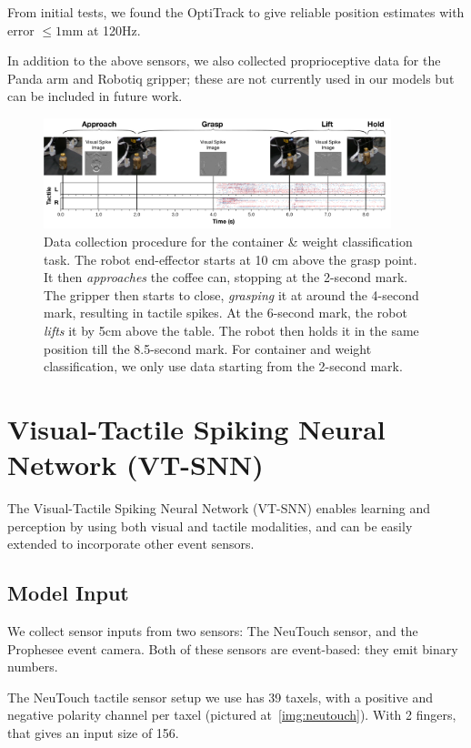 \documentclass[fyp]{socreport}
\begin{document}
From initial tests, we found the OptiTrack to give reliable position estimates
with error $\leq 1$mm at 120Hz.

In addition to the above sensors, we also collected proprioceptive data for the
Panda arm and Robotiq gripper; these are not currently used in our models but
can be included in future work.

\begin{figure}
\centering
\includegraphics[width=0.90\textwidth]{images/robotsetup/RobotMotion_Exp1.pdf}
\caption{Data collection procedure for the container \& weight classification
  task. The robot end-effector starts at 10 cm above the grasp point. It then
  \emph{approaches} the coffee can, stopping at the 2-second mark. The gripper
  then starts to close, \emph{grasping} it at around the 4-second mark,
  resulting in tactile spikes. At the 6-second mark, the robot \emph{lifts} it
  by 5cm above the table. The robot then holds it in the same position till the
  8.5-second mark. For container and weight classification, we only use data
  starting from the 2-second mark.}
\label{fig:robot_motion}
\end{figure}

\chapter{Visual-Tactile Spiking Neural Network (VT-SNN)\label{cha:vtsnn}}

The Visual-Tactile Spiking Neural Network (VT-SNN) enables learning and
perception by using both visual and tactile modalities, and can be easily
extended to incorporate other event sensors.

\section{Model Input}

We collect sensor inputs from two sensors: The NeuTouch sensor, and the
Prophesee event camera. Both of these sensors are event-based: they emit binary
numbers.

The NeuTouch tactile sensor setup we use has 39 taxels, with a positive and
negative polarity channel per taxel (pictured at~\autoref{img:neutouch}).
With 2 fingers, that gives an input size of 156.
\end{document}
